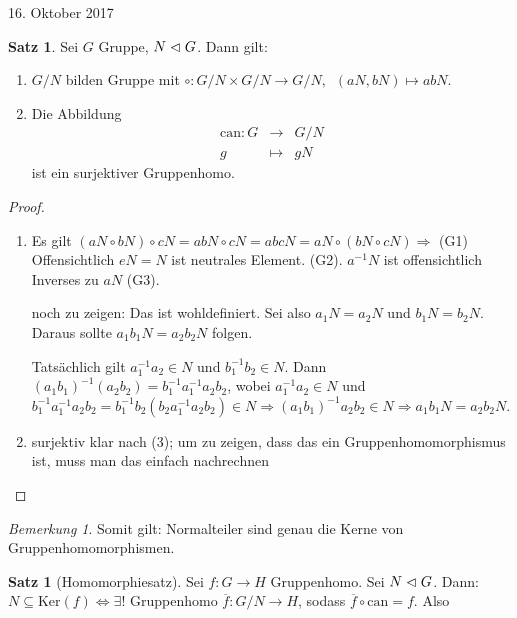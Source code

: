 \documentclass[12pt,a4paper]{article}
\newcounter{thmcounter}[subsection]
\theoremstyle{definition}
\theoremstyle{remark}
\newtheorem*{bem}{Bemerkung}
\theoremstyle{definition}
\newtheorem{satz}[thmcounter]{Satz}
\theoremstyle{definition}
\theoremstyle{plain}
\theoremstyle{plain}
\begin{document}
\vspace{1cm}
\hfill 16. Oktober 2017

\begin{satz}
	Sei $G$ Gruppe, $N\vartriangleleft G$. Dann gilt:\begin{enumerate}
		\item $G/N$ bilden Gruppe mit $\circ\colon G/N\times G/N \to G/N,\enspace (aN, bN)\mapsto abN$.
		\item Die Abbildung 
		\begin{eqnarray*}
			\mbox{can}\colon G &\to & G/N\\
			g&\mapsto& gN
		\end{eqnarray*}
	ist ein surjektiver Gruppenhomo.
	\end{enumerate}
\end{satz}

\begin{proof}
	\leavevmode
	\begin{enumerate}
		\item Es gilt $(aN\circ bN)\circ cN = abN\circ cN = abc N = aN\circ (bN\circ cN) \Rightarrow$ (G1)
		Offensichtlich $eN = N$ ist neutrales Element. (G2).
		$a^{-1}N$ ist offensichtlich Inverses zu $aN$ (G3).
		
		noch zu zeigen: Das ist wohldefiniert. Sei also $a_1N = a_2N$ und $b_1N = b_2N$. Daraus sollte $a_1b_1N = a_2b_2N$ folgen.
		
		Tatsächlich gilt $a_1^{-1}a_2 \in N$ und $b_1^{-1}b_2\in N$. Dann $(a_1b_1)^{-1}(a_2b_2) = b_1^{-1}a_1^{-1} a_2b_2$, wobei $a_1^{-1}a_2\in N$ und $b_1^{-1}a_1^{-1} a_2b_2 = b_1^{-1}b_2(b_2a_1^{-1}a_2b_2)\in N \Rightarrow (a_1b_1)^{-1}a_2b_2\in N\Rightarrow a_1b_1N = a_2b_2N$.
		
		\item surjektiv klar nach (3); um zu zeigen, dass das ein Gruppenhomomorphismus ist, muss man das einfach nachrechnen
	\end{enumerate}
\end{proof}

\begin{bem}
	Somit gilt: Normalteiler sind genau die Kerne von Gruppenhomomorphismen.
\end{bem}

\begin{satz}[Homomorphiesatz]
	Sei $f\colon G\to H$ Gruppenhomo. Sei $N\vartriangleleft G$. Dann: $N\subseteq \mbox{Ker}(f)\Leftrightarrow \exists!$ Gruppenhomo $\overline{f}\colon G/N\to H$, sodass $\overline{f}\circ \mbox{can} = f$. Also 
	
\end{satz}
\end{document}
